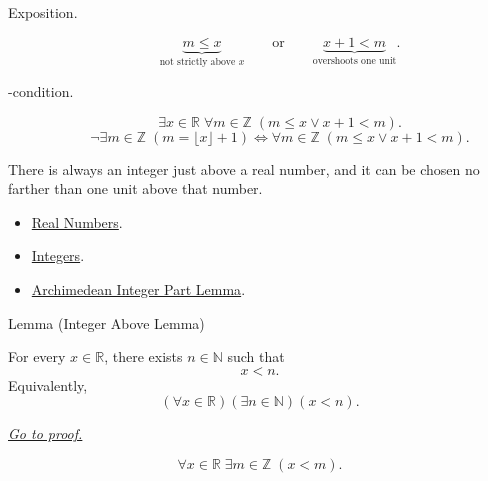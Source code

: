 \begin{remark*}
\begin{description}
  \item[Exposition.]
\[
\underbrace{m\le x}_{\text{not strictly above }x}
\qquad\text{or}\qquad
\underbrace{x+1<m}_{\text{overshoots one unit}}.
\]


  \item[\exists-condition.]
  \[
\exists x\in\mathbb{R}\;\forall m\in\mathbb{Z}\;(m\le x\lor x+1<m).
\]
\[
\neg\exists m\in\mathbb{Z}\;(m=\lfloor x\rfloor+1)
\Longleftrightarrow
\forall m\in\mathbb{Z}\;(m\le x\lor x+1<m).
\]
\end{description}
\end{remark*}

\begin{remark*}[Interpretation]
There is always an integer just above a real number, and it can be chosen no
farther than one unit above that number.
\end{remark*}

\begin{dependencies}
\begin{itemize}
\item \hyperref[def:reals]{Real Numbers}.
\item \hyperref[def:integers]{Integers}.
\item \hyperref[lem:archimedean-integer-part-lemma]{Archimedean Integer Part Lemma}.
\end{itemize}
\end{dependencies}



\begin{lemmabox}{Lemma (Integer Above Lemma)}
\begin{lemma}
\label{lem:integer-above-lemma}
For every $x\in\mathbb{R}$, there exists $n\in\mathbb{N}$ such that
\[
  x<n.
\]
Equivalently,
\[
  (\forall x\in\mathbb{R})(\exists n\in\mathbb{N})(x<n).
\]

\smallskip
\noindent
\hyperref[prf:integer-above-lemma]{\textit{Go to proof.}}
\end{lemma}
\end{lemmabox}

\begin{remark*}
\[
\forall x\in\mathbb{R}\;\exists m\in\mathbb{Z}\;(x<m).
\]
\end{remark*}

